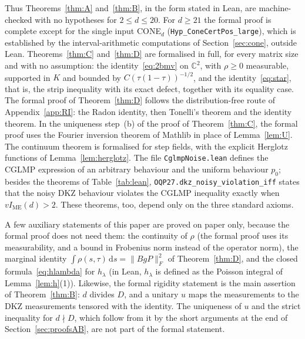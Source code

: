 \documentclass[11pt]{amsart}
\theoremstyle{definition}
\theoremstyle{remark}
\numberwithin{equation}{section}
\newcommand{\C}{\mathbb{C}}
\newcommand{\IME}{I_{\mathrm{ME}}}
\newcommand{\dd}{\,\mathrm{d}}
\begin{document}
Thus Theorems~\ref{thm:A} and~\ref{thm:B}, in the form stated in Lean, are machine-checked with no hypotheses for
$2\le d\le20$. For $d\ge21$ the formal proof is complete except for the single input CONE$_d$
(\nolinkurl{Hyp_ConeCertPos_large}), which is established by the interval-arithmetic computations of
Section~\ref{sec:cone}, outside Lean. Theorems~\ref{thm:C} and~\ref{thm:D} are formalised in full, for every matrix size
and with no assumption: the identity~\eqref{eq:2bmv} on $\C^2$, with $\rho\ge0$ measurable, supported in $K$ and bounded
by $C(\tau(1-\tau))^{-1/2}$, and the identity~\eqref{eq:star}, that is, the strip inequality with its exact defect, together
with its equality case. The formal proof of Theorem~\ref{thm:D} follows the distribution-free route of
Appendix~\ref{app:RI}: the Radon identity, then Tonelli's theorem and the identity theorem. In the uniqueness step~(b) of
the proof of Theorem~\ref{thm:C}, the formal proof uses the Fourier inversion theorem of Mathlib in place of
Lemma~\ref{lem:U}. The continuum theorem is formalised for step fields, with the explicit Herglotz functions of
Lemma~\ref{lem:herglotz}. The file \texttt{CglmpNoise.lean} defines the CGLMP expression of an arbitrary behaviour and
the uniform behaviour $p_0$; besides the theorems of Table~\ref{tab:lean}, \nolinkurl{OQP27.dkz_noisy_violation_iff}
states that the noisy DKZ behaviour violates the CGLMP inequality exactly when $v\IME(d)>2$. These theorems, too, depend
only on the three standard axioms.

A few auxiliary statements of this paper are proved on paper only, because the formal proof does not need them: the
continuity of $\rho$ (the formal proof uses its measurability, and a bound in Frobenius norm instead of the operator norm),
the marginal identity $\int\rho(s,\tau)\dd s=\|BgP\|_F^2$ of Theorem~\ref{thm:D}, and the closed formula~\eqref{eq:hlambda}
for $h_\lambda$ (in Lean, $h_\lambda$ is defined as the Poisson integral of Lemma~\ref{lem:h}(1)). Likewise, the formal
rigidity statement is the main assertion of Theorem~\ref{thm:B}: $d$ divides $D$, and a unitary $u$ maps the measurements to
the DKZ measurements tensored with the identity. The uniqueness of $u$ and the strict inequality for $d\nmid D$, which
follow from it by the short arguments at the end of Section~\ref{sec:proofsAB}, are not part of the formal statement.
\end{document}
